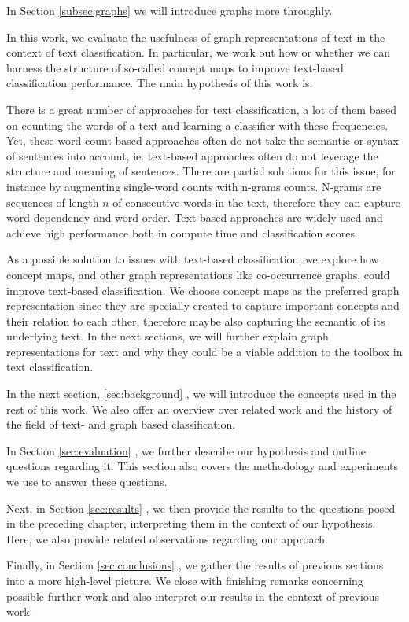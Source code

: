 In Section \ref{subsec:graphs} we will introduce graphs more throughly.

In this work, we evaluate the usefulness of graph representations of text in the context of text classification. In particular, we work out how or whether we can harness the structure of so-called concept maps to improve text-based classification performance.
The main hypothesis of this work is:
\begin{quote}
\hypothesis
\end{quote}

There is a great number of approaches for text classification, a lot of them based on counting the words of a text and learning a classifier with these frequencies.
Yet, these word-count based approaches often do not take the semantic or syntax of sentences into account, ie. text-based approaches often do not leverage the structure and meaning of sentences.
There are partial solutions for this issue, for instance by augmenting single-word counts with n-grams counts.
N-grams are sequences of length $n$ of consecutive words in the text, therefore they can capture word dependency and word order.
Text-based approaches are widely used and achieve high performance both in compute time and classification scores.

As a possible solution to issues with text-based classification, we explore how concept maps, and other graph representations like co-occurrence graphs, could improve text-based classification.
We choose concept maps as the preferred graph representation since they are specially created to capture important concepts and their relation to each other, therefore maybe also capturing the semantic of its underlying text.
In the next sections, we will further explain graph representations for text and why they could be a viable addition to the toolbox in text classification.

In the next section, \ref{sec:background} , we will introduce the concepts used in the rest of this work.
We also offer an overview over related work and the history of the field of text- and graph based classification.

In Section \ref{sec:evaluation} , we further describe our hypothesis and outline questions regarding it. This section also covers the methodology and experiments we use to answer these questions.

Next, in Section \ref{sec:results} , we then provide the results to the questions posed in the preceding chapter, interpreting them in the context of our hypothesis.
Here, we also provide related observations regarding our approach.

Finally, in Section \ref{sec:conclusions} , we gather the results of previous sections into a more high-level picture.
We close with finishing remarks concerning possible further work and also interpret our results in the context of previous work.